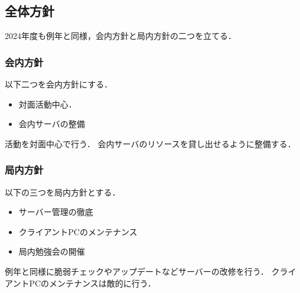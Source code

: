 \subsection*{全体方針}


2024年度も例年と同様，会内方針と局内方針の二つを立てる．

\subsubsection*{会内方針}
以下二つを会内方針にする．
\begin{itemize}
    \item 対面活動中心．
    \item 会内サーバの整備
\end{itemize}
活動を対面中心で行う．
会内サーバのリソースを貸し出せるように整備する．

\subsubsection*{局内方針}
以下の三つを局内方針とする．
\begin{itemize}
    \item サーバー管理の徹底
    \item クライアントPCのメンテナンス
    \item 局内勉強会の開催
\end{itemize}
例年と同様に脆弱チェックやアップデートなどサーバーの改修を行う．
クライアントPCのメンテナンスは敵的に行う．
